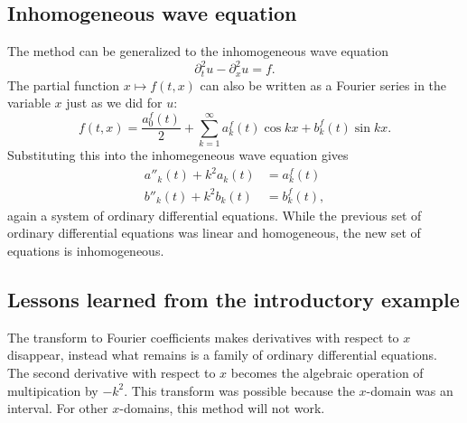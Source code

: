 \subsection{Inhomogeneous wave equation}
The method can be generalized to the inhomogeneous wave equation
\[
\partial_t^2u-\partial_x^2u=f.
\]
The partial function $x\mapsto f(t,x)$ can also be written 
as a Fourier series in the variable $x$ just as we did for $u$:
\[
f(t,x)=\frac{a_0^f(t)}2+\sum_{k=1}^\infty a_k^f(t)\cos kx+b_k^f(t)\sin kx.
\]
Substituting this into the inhomegeneous wave equation gives
\begin{align*}
a''_k(t)+k^2a_k(t)&=a_k^f(t)\\
b''_k(t)+k^2b_k(t)&=b_k^f(t),
\end{align*}
again a system of ordinary differential equations.
While the previous set of ordinary differential equations was linear
and homogeneous, the new set of equations is inhomogeneous.

\subsection{Lessons learned from the introductory example}
The transform to Fourier coefficients makes derivatives with respect
to $x$ disappear, instead what remains is a family of ordinary
differential equations.
The second derivative with respect to $x$ becomes the algebraic
operation of multipication by $-k^2$.
This transform was possible because the $x$-domain was an interval.
For other $x$-domains, this method will not work.

